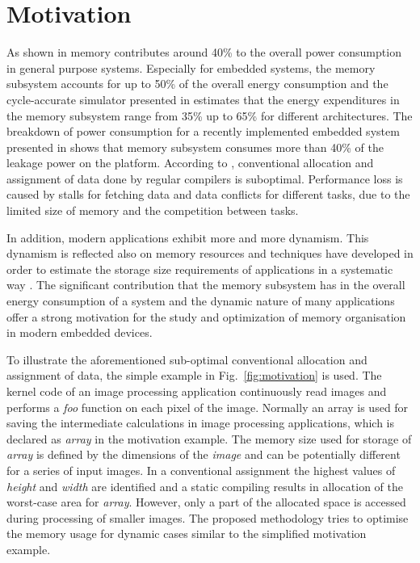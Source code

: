 \documentclass[a4paper,conference]{IEEEtran}
\begin{document}
\section{Motivation}
\label{sec:motivation}

As shown in \cite{Gonzalez1996} memory contributes around 40\% to the overall power consumption in general purpose systems. Especially for embedded systems, the memory subsystem accounts for up to 50\% of the overall energy consumption \cite{Che09} and the cycle-accurate simulator presented in \cite{Ben99} estimates that the energy expenditures in the memory subsystem range from 35\% up to 65\% for different architectures. The breakdown of power consumption for a recently implemented embedded system presented in \cite{Hul11} shows that memory subsystem consumes more than 40\% of the leakage power on the platform. According to \cite{tcm}, conventional allocation and assignment of data done by regular compilers is suboptimal. Performance loss is caused by stalls for fetching data and data conflicts for different tasks, due to the limited size of memory and the competition between tasks. 

In addition, modern applications exhibit more and more dynamism. This dynamism is reflected also on memory resources and techniques have developed in order to estimate the storage size requirements of applications in a systematic way \cite{Ang13}. The significant contribution that the memory subsystem has in the overall energy consumption of a system and the dynamic nature of many applications offer a strong motivation for the study and optimization of memory organisation in modern embedded devices.

To illustrate the aforementioned sub-optimal conventional allocation and assignment of data, the simple example in Fig.~\ref{fig:motivation} is used. The kernel code of an image processing application continuously read images and performs a \textit{foo} function on each pixel of the image. Normally an array is used for saving the intermediate calculations in image processing applications, which is declared as \textit{array} in the motivation example. The memory size used for storage of \textit{array}  is defined by the dimensions of the \textit{image} and can be potentially different for a series of input images. In a conventional assignment the highest values of \textit{height} and \textit{width} are identified and a static compiling results in allocation of the worst-case area for \textit{array}. However, only a part of the allocated space is accessed during processing of smaller images. The proposed methodology tries to optimise the memory usage for dynamic cases similar to the simplified motivation example.
\end{document}
